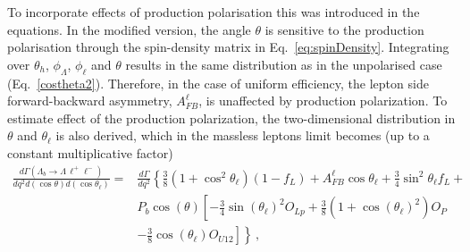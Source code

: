 To incorporate effects of production polarisation this was introduced in the equations.
%
In the modified version, the angle $\theta$ is sensitive to the production polarisation
through the spin-density matrix in Eq.~\ref{eq:spinDensity}. 
Integrating over $\theta_h$, $\phi_\Lambda$, $\phi_\ell$ and $\theta$ results in 
the same distribution as in the unpolarised case (Eq.~\ref{costheta2}). Therefore, in the case of uniform
efficiency, the lepton side forward-backward asymmetry, $A_{FB}^\ell$, is unaffected by production
polarization. To estimate effect of the production polarization, the two-dimensional
distribution in $\theta$ and $\theta_\ell$ is also derived, which in the massless leptons
limit becomes (up to a  constant multiplicative factor)
%
\begin{align}
\frac{d\Gamma(\Lambda_{b}\to \Lambda \,\ell^{+}\ell^{-})}{dq^2d(\cos\theta) d(\cos\theta_\ell)}=&
\frac{d\Gamma}{dq^2}\left\{  \frac{3}{8}\left(1+\cos^2\theta_\ell\right)(1-f_L)+A_{FB}^\ell\cos\theta_\ell +
   \frac{3}{4}\sin^2\theta_\ell f_L+\right. \nonumber \\
&P_b\cos(\theta)\left[ -\frac{3}{4}\sin(\theta_\ell)^2O_{Lp}+
  \frac{3}{8}\left(1+\cos(\theta_\ell)^2\right)O_P\right. \nonumber \\
&\left.\left.-\frac{3}{8}\cos(\theta_\ell)O_{U12} \right]\right\}\,,
\label{eq:lepton2D}
\end{align}
